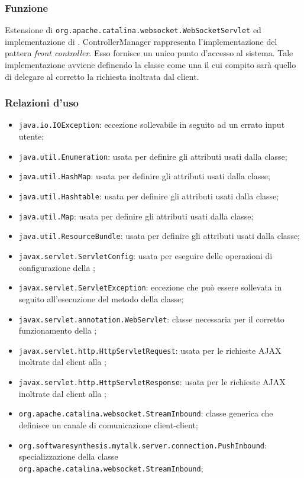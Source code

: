 
\subsubsection*{Funzione}
Estensione di \texttt{org.apache.catalina.websocket.WebSocketServlet} ed implementazione di . ControllerManager rappresenta l'implementazione del pattern \textit{front controller}. Esso fornisce un unico punto d'accesso al sistema. Tale implementazione avviene definendo la classe come una  il cui compito sarà quello di delegare al  corretto la richiesta inoltrata dal client.

\subsubsection*{Relazioni d'uso}
\begin{itemize}
	\item \texttt{java.io.IOException}: eccezione sollevabile in seguito ad un errato input utente;
	\item \texttt{java.util.Enumeration}: usata per definire gli attributi usati dalla classe;
	\item \texttt{java.util.HashMap}: usata per definire gli attributi usati dalla classe;
	\item \texttt{java.util.Hashtable}: usata per definire gli attributi usati dalla classe;
	\item \texttt{java.util.Map}: usata per definire gli attributi usati dalla classe;
	\item \texttt{java.util.ResourceBundle}: usata per definire gli attributi usati dalla classe;
	\item \texttt{javax.servlet.ServletConfig}: usata per eseguire delle operazioni di configurazione della ;
	\item \texttt{javax.servlet.ServletException}: eccezione che può essere sollevata in seguito all'esecuzione del metodo  della classe;
	\item \texttt{javax.servlet.annotation.WebServlet}: classe necessaria per il corretto funzionamento della ;
	\item \texttt{javax.servlet.http.HttpServletRequest}: usata per le richieste AJAX inoltrate dal client alla ;
	\item \texttt{javax.servlet.http.HttpServletResponse}: usata per le richieste AJAX inoltrate dal client alla ;
	\item \texttt{org.apache.catalina.websocket.StreamInbound}: classe generica che definisce un canale di comunicazione client-client;
	\item \texttt{org.softwaresynthesis.mytalk.server.connection.PushInbound}: specializzazione della classe \texttt{org.apache.catalina.websocket.StreamInbound};

\end{itemize}

